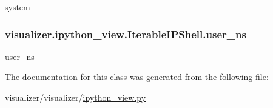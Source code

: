 system 

\subsubsection[{\texorpdfstring{user\+\_\+ns}{user_ns}}]{\setlength{\rightskip}{0pt plus 5cm}visualizer.\+ipython\+\_\+view.\+Iterable\+I\+P\+Shell.\+user\+\_\+ns\hspace{0.3cm}{\ttfamily [static]}}\hypertarget{classvisualizer_1_1ipython__view_1_1IterableIPShell_a7b1a1512a93db333ef833a37845015b2}{}\label{classvisualizer_1_1ipython__view_1_1IterableIPShell_a7b1a1512a93db333ef833a37845015b2}


user\+\_\+ns 



The documentation for this class was generated from the following file\+:\begin{DoxyCompactItemize}
\item 
visualizer/visualizer/\hyperlink{ipython__view_8py}{ipython\+\_\+view.\+py}\end{DoxyCompactItemize}

